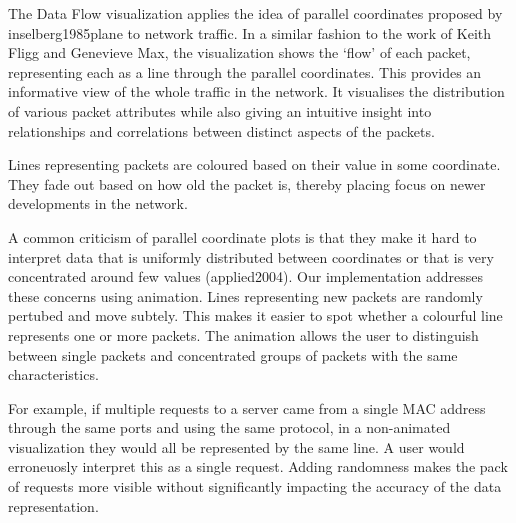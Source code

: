 The Data Flow visualization applies the idea of parallel coordinates proposed by inselberg1985plane to network traffic. In a similar fashion to the work of Keith Fligg and Genevieve Max, the visualization shows the `flow' of each packet, representing each as a line through the parallel coordinates. This provides an informative view of the whole traffic in the network. It visualises the distribution of various packet attributes while also giving an intuitive insight into relationships and correlations between distinct aspects of the packets.

Lines representing packets are coloured based on their value in some coordinate. They fade out based on how old the packet is, thereby placing focus on newer developments in the network. 

A common criticism of parallel coordinate plots is that they make it hard to interpret data that is uniformly distributed between coordinates or that is very concentrated around few values (applied2004). Our implementation addresses these concerns using animation. Lines representing new packets are randomly pertubed and move subtely. This makes it easier to spot whether a colourful line represents one or more packets. The animation allows the user to distinguish between single packets and concentrated groups of packets with the same characteristics.

For example, if multiple requests to a server came from a single MAC address through the same ports and using the same protocol, in a non-animated visualization they would all be represented by the same line. A user would erroneuosly interpret this as a single request. Adding randomness makes the pack of requests more visible without significantly impacting the accuracy of the data representation.